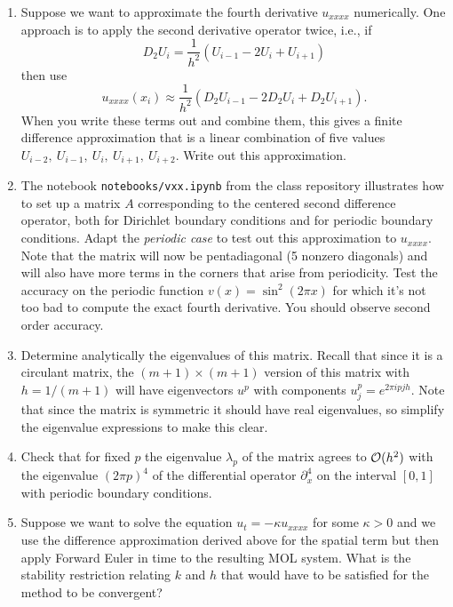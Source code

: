 \documentclass[10pt]{article}
\begin{document}
\begin{enumerate} 
\item Suppose we want to approximate the fourth derivative $u_{xxxx}$
numerically. One approach is to apply the second derivative operator twice,
i.e., if 
\[
D_2 U_i = \frac 1 {h^2}(U_{i-1} - 2U_i + U_{i+1})
\]
then use
\[
u_{xxxx}(x_i) \approx \frac 1 {h^2}(D_2 U_{i-1} - 2D_2 U_i + D_2 U_{i+1}).
\]
When you write these terms out and combine them, this gives a finite
difference approximation that is a linear combination of five values
$U_{i-2},~U_{i-1},~U_i,~U_{i+1},~U_{i+2}$.  
Write out this approximation.


\item The notebook \verb+notebooks/vxx.ipynb+ from the
class repository illustrates how to set up a matrix $A$ corresponding
to the centered second difference operator, both for Dirichlet
boundary conditions and for periodic boundary conditions.  Adapt
the {\it periodic case} to test out this approximation to $u_{xxxx}$.
Note that the matrix will now be pentadiagonal (5 nonzero diagonals)
and will also have more terms in the corners that arise from periodicity.
Test the accuracy on the periodic function $v(x) = \sin^2(2\pi x)$
for which it's not too bad to compute the exact fourth derivative.  
You should observe second order accuracy.

\item Determine analytically the eigenvalues of this matrix.  Recall that
since it is a circulant matrix, the $(m+1)\times (m+1)$ version of this
matrix with $h=1/(m+1)$  will have eigenvectors $u^p$ with components 
$u^p_j = e^{2\pi i pjh}$.  Note that since the matrix is symmetric it should
have real eigenvalues, so simplify the eigenvalue expressions to make this
clear. 

\item Check that for fixed $p$ the eigenvalue $\lambda_p$ of the matrix
agrees to ${\mathcal O}(h^2)$  with the eigenvalue $(2\pi p)^4$ of the differential
operator $\partial_x^4$ on the interval $[0,1]$ with periodic boundary
conditions.

\item Suppose we want to solve the equation $u_t = -\kappa u_{xxxx}$
for some $\kappa >0$ and we use the difference approximation derived
above for the spatial term but then apply Forward Euler in time to
the resulting MOL system.  What is the stability restriction relating
$k$ and $h$ that would have to be satisfied for the method to be
convergent?  

\end{enumerate}
\end{document}
